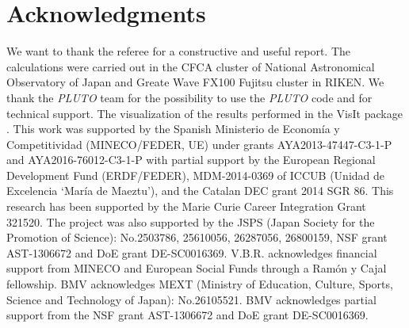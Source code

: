 \documentclass[usenatbib]{mn2e}
\begin{document}
\section{Acknowledgments}
We want to thank the referee for a constructive and useful report.
The calculations were carried out in the CFCA cluster of National Astronomical Observatory of Japan and Greate Wave FX100 Fujitsu cluster in RIKEN. 
We thank 
the
{\it PLUTO} team for the possibility to use the {\it PLUTO} code and for technical support. 
The visualization of the results performed in the VisIt package \citep{HPV:VisIt}. 
This work was supported by the Spanish Ministerio de Econom\'{i}a y Competitividad (MINECO/FEDER, UE) under grants AYA2013-47447-C3-1-P and AYA2016-76012-C3-1-P with partial support by the European Regional Development Fund (ERDF/FEDER), MDM-2014-0369 of ICCUB (Unidad de Excelencia `Mar\'{i}a de Maeztu'), and the Catalan DEC grant 2014 SGR 86. This research has been supported by the Marie Curie Career Integration Grant 321520. The project was also supported by the JSPS (Japan Society for the Promotion of Science):
No.2503786, 25610056, 26287056, 26800159, NSF  grant AST-1306672 and DoE grant DE-SC0016369. 
V.B.R. acknowledges financial support from MINECO and European Social Funds through a Ram\'on y Cajal fellowship. BMV acknowledges MEXT (Ministry of Education, Culture, Sports, Science and Technology of Japan): No.26105521. BMV acknowledges partial support from the NSF grant AST-1306672 and DoE grant DE-SC0016369. 
%
%
\end{document}
